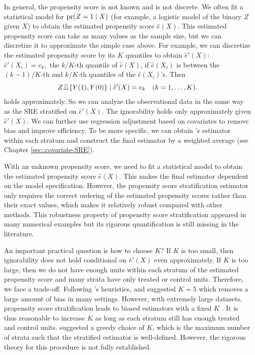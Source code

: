 In general, the propensity score is not known and is not discrete. We often fit a statistical model for $\textup{pr}(Z = 1\mid X)$ (for example, a logistic model of the binary $Z$ given $X$) to obtain the estimated propensity score $\hat{e}(X)$. This estimated propensity score can take as many values as the sample size, but we can discretize it to approximate the simple case above. For example, we can discretize the estimated propensity score by its $K$ quantiles to obtain $\hat{e}'(X)$:
$
\hat{e}'(X_i) = e_k,
$
the $k/K$-th quantile of $\hat{e}(X)$,
if $ \hat{e}(X_i)$ is between the $(k-1)/K$-th and $k/K$-th quantiles of the $\hat{e}(X_i)$'s. Then  
$$
Z\ind \{ Y(1), Y(0)  \} \mid \hat{e}'(X) = e_k  \quad (k=1,\ldots, K).
$$
holds approximately. So we can analyze the observational data in the same way as the SRE stratified on $\hat{e}'(X)$. 
The ignorability holds only approximately given $\hat{e}'(X)$. We can further use regression adjustment based on covariates to remove bias and improve efficiency. To be more specific, we can obtain \citet{lin2013}'s  estimator within each stratum and construct the final estimator by a weighted average (see Chapter \ref{sec::covariate-SRE}). 


 




With an unknown propensity score, we need to fit a statistical model to obtain the estimated propensity score $\hat{e}(X)$. This makes the final estimator dependent on the model specification. However, the propensity score stratification estimator only requires the correct ordering of the estimated propensity scores rather than their exact values, which makes it relatively robust compared with other methods. This robustness property of propensity score stratification appeared in many numerical examples but its rigorous quantification is still missing in the literature. 




An important practical question is how to choose $K$? If $K$ is too small, then ignorability does not hold conditional on $\hat{e}'(X)$ even approximately. If $K$ is too large, then we do not have enough units within each stratum of the estimated propensity score and many strata have only treated or control units. Therefore, we face a trade-off. Following \citet{cochran1968effectiveness}'s heuristics, \citet{rosenbaum1983central} and \citet{rosenbaum1984reducing} suggested $K=5$ which removes a large amount of bias in many settings. However, with extremely large datasets, propensity score stratification leads to biased estimators with a fixed $K$ \citep{lunceford2004stratification}. It is thus reasonable to increase $K$ as long as each stratum still has enough treated and control units. \citet{wang2020robust} suggested a greedy choice of $K$, which is the maximum number of strata such that the stratified estimator is well-defined. However, the rigorous theory for this procedure is not fully established. 




